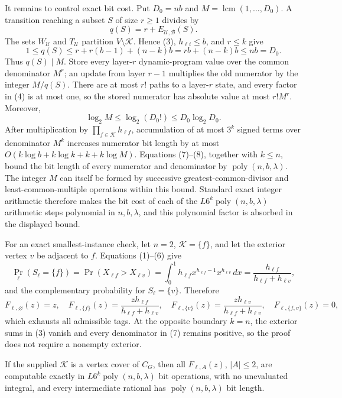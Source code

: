 It remains to control exact bit cost.  Put \(D_0=nb\) and \(M=\operatorname{lcm}(1,\ldots,D_0)\).  A transition reaching a subset \(S\) of size \(r\geq1\) divides by
\[
 q(S)=r+E_{\mathcal U,\mathcal B}(S).
\]
The sets \(W_{\mathcal U}\) and \(T_{\mathcal U}\) partition \(V\setminus\mathcal K\).  Hence (3), \(h_{\ell i}\leq b\), and \(r\leq k\) give
\[
 1\leq q(S)
 \leq r+r(b-1)+(n-k)b
 =rb+(n-k)b
 \leq nb=D_0.                                                                 \tag{7}
\]
Thus \(q(S)\mid M\).  Store every layer-\(r\) dynamic-program value over the common denominator \(M^r\); an update from layer \(r-1\) multiplies the old numerator by the integer \(M/q(S)\).  There are at most \(r!\) paths to a layer-\(r\) state, and every factor in (4) is at most one, so the stored numerator has absolute value at most \(r!M^r\).  Moreover,
\[
 \log_2 M\leq\log_2(D_0!)\leq D_0\log_2 D_0.                                 \tag{8}
\]
After multiplication by \(\prod_{f\in\mathcal K}h_{\ell f}\), accumulation of at most \(3^k\) signed terms over denominator \(M^k\) increases numerator bit length by at most \(O(k\log b+k\log k+k+k\log M)\).  Equations (7)--(8), together with \(k\leq n\), bound the bit length of every numerator and denominator by \(\operatorname{poly}(n,b,\lambda)\).  The integer \(M\) can itself be formed by successive greatest-common-divisor and least-common-multiple operations within this bound.  Standard exact integer arithmetic therefore makes the bit cost of each of the \(L6^k\operatorname{poly}(n,b,\lambda)\) arithmetic steps polynomial in \(n,b,\lambda\), and this polynomial factor is absorbed in the displayed bound.

For an exact smallest-instance check, let \(n=2\), \(\mathcal K=\{f\}\), and let the exterior vertex \(v\) be adjacent to \(f\).  Equations (1)--(6) give
\[
 \Pr_{\ell}(S_{\ell}=\{f\})
 =\Pr(X_{\ell f}>X_{\ell v})
 =\int_0^1h_{\ell f}x^{h_{\ell f}-1}x^{h_{\ell v}}\,dx
 =\frac{h_{\ell f}}{h_{\ell f}+h_{\ell v}},
\]
and the complementary probability for \(S_{\ell}=\{v\}\).  Therefore
\[
 F_{\ell,\varnothing}(z)=z,
 \quad
 F_{\ell,\{f\}}(z)=\frac{zh_{\ell f}}{h_{\ell f}+h_{\ell v}},
 \quad
 F_{\ell,\{v\}}(z)=\frac{zh_{\ell v}}{h_{\ell f}+h_{\ell v}},
 \quad
 F_{\ell,\{f,v\}}(z)=0,
\]
which exhausts all admissible tags.  At the opposite boundary \(k=n\), the exterior sums in (3) vanish and every denominator in (7) remains positive, so the proof does not require a nonempty exterior.

If the supplied \(\mathcal K\) is a vertex cover of \(C_G\), then all \(F_{\ell,A}(z)\), \(|A|\le2\), are computable exactly in \(L6^k\operatorname{poly}(n,b,\lambda)\) bit operations, with no unevaluated integral, and every intermediate rational has \(\operatorname{poly}(n,b,\lambda)\) bit length.

